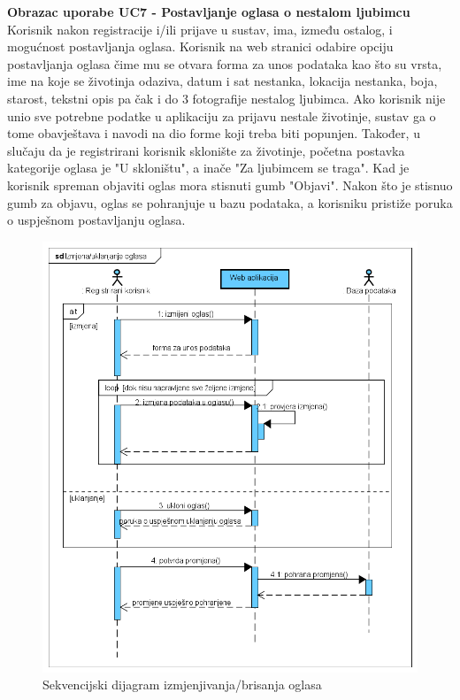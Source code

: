 			\noindent\textbf{Obrazac uporabe UC7 - Postavljanje oglasa o nestalom ljubimcu}\newline
			\noindent Korisnik nakon registracije i/ili prijave u sustav, ima, između ostalog, i mogućnost postavljanja oglasa. Korisnik na web stranici odabire opciju postavljanja oglasa čime mu se otvara forma za unos podataka kao što su vrsta, ime na koje se životinja odaziva, datum i sat nestanka, lokacija nestanka, boja, starost, tekstni opis pa čak i do 3 fotografije nestalog ljubimca. Ako korisnik nije unio sve potrebne podatke u aplikaciju za prijavu nestale životinje, sustav ga o tome obavještava i navodi na dio forme koji treba biti popunjen. Također, u slučaju da je registrirani korisnik sklonište za životinje, početna postavka kategorije oglasa je "U skloništu", a inače "Za ljubimcem se traga". Kad je korisnik spreman objaviti oglas mora stisnuti gumb "Objavi". Nakon što je stisnuo gumb za objavu, oglas se pohranjuje u bazu podataka, a korisniku pristiže poruka o uspješnom postavljanju oglasa.		
			
			\begin{figure}[H]
				\includegraphics[scale=0.6]{slike/seq_izmjena_oglasa.PNG} 
				\centering
				\caption{Sekvencijski dijagram izmjenjivanja/brisanja oglasa}
				\label{seq_izmjena_oglasa}
			\end{figure}
			
